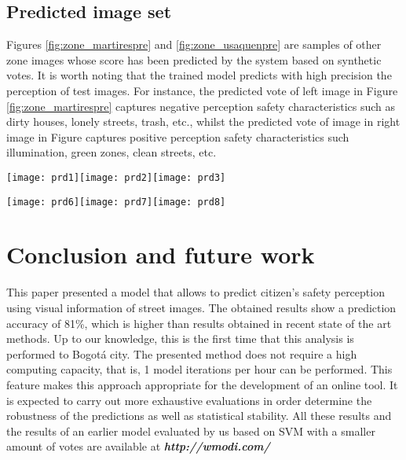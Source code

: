 \documentclass{llncs}
\begin{document}
\subsection{Predicted image set}
Figures \ref{fig:zone_martirespre} and \ref{fig:zone_usaquenpre} are samples of other zone images whose score has been predicted by the system based on synthetic votes. It is worth noting that the trained model predicts with high precision the perception of test images. For instance, the predicted vote of left image in Figure \ref{fig:zone_martirespre} captures negative perception safety characteristics such as dirty houses, lonely streets, trash, etc., whilst the predicted vote of image in right image in Figure \label{fig:zone_usaquenpre} captures positive perception safety characteristics such illumination, green zones, clean streets, etc.

\begin{center}
	\centering
	\texttt{[image: prd1]}\hspace{1mm}\texttt{[image: prd2]}\hspace{1mm}\texttt{[image: prd3]}
	\label{fig:zone_martirespre}
\end{center}

\begin{center}
	\centering
	\texttt{[image: prd6]}\hspace{1mm}\texttt{[image: prd7]}\hspace{1mm}\texttt{[image: prd8]}
	\label{fig:zone_usaquenpre}
\end{center}

\section{Conclusion and future work}
This paper presented a model that allows to predict citizen's safety perception using visual information of street images. The obtained results show a prediction accuracy of 81\%, which is higher than results obtained in recent state of the art methods. Up to our knowledge, this is the first time that this analysis is performed to Bogotá city. The presented method does not require a high computing capacity, that is, 1 model iterations per hour can be performed. This feature makes this approach appropriate for the development of an online tool. It is expected to carry out more exhaustive evaluations in order determine the robustness of the predictions as well as statistical stability. All these results and the results of an earlier model evaluated by us based on SVM with a smaller amount of votes are available at \textbf{\textit{http://wmodi.com/}}

       


\end{document}
